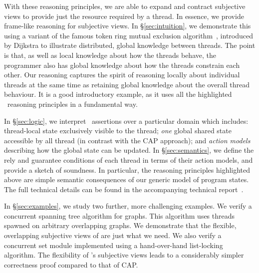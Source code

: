 With these reasoning principles, we are able to expand and contract subjective views  to provide just the resource required by a thread.
In essence, we provide  frame-like reasoning for  subjective  views. 
In \S\ref{sec:intuition}, we demonstrate this using a variant of the famous  token ring mutual exclusion algorithm~\cite{dijkstra74}, introduced by Dijkstra to illustrate distributed, global knowledge between threads. The point is that, as well as local knowledge about how the threads behave, the programmer also has global knowledge about how the threads constrain each other. Our reasoning captures the spirit of reasoning locally about individual threads at the same time as retaining global knowledge about the overall thread behaviour. It is a good  introductory example, as it uses all the highlighted \colosl\ reasoning principles in a fundamental way. 

In \S\ref{sec:logic}, we interpret \colosl\ assertions over a particular domain which includes: thread-local state exclusively visible to the thread; {\em one} global shared state accessible by all thread (in contrast with the CAP approach); and {\em action models} describing how the global state can be updated. In \S\ref{sec:semantics}, we define the rely and guarantee conditions of each thread in terms of their action models, and provide a sketch of soundness. In particular, the reasoning principles highlighted above are simple semantic
consequences of our generic model of program states.  The full technical details can be found in the accompanying technical report~\cite{colosl-tr14}.


In \S\ref{sec:examples}, we study two further, more challenging examples. We verify a concurrent spanning tree algorithm for graphs. This algorithm uses threads spawned on arbitrary overlapping graphs. We demonstrate that the flexible, overlapping subjective views of \colosl are just what we need.  We also verify a concurrent set
module implemented using a hand-over-hand list-locking algorithm.
The flexibility of \colosl's subjective views leads to a considerably simpler correctness proof compared to that of CAP. 


